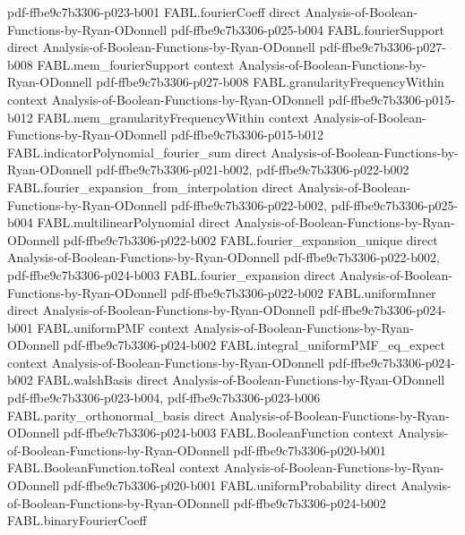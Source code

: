 \begin{theorem}
  {pdf-ffbe9c7b3306-p023-b001}
\proofstep
  {FABL.fourierCoeff}
  {direct}
  {Analysis-of-Boolean-Functions-by-Ryan-ODonnell}
  {pdf-ffbe9c7b3306-p025-b004}
\proofstep
  {FABL.fourierSupport}
  {direct}
  {Analysis-of-Boolean-Functions-by-Ryan-ODonnell}
  {pdf-ffbe9c7b3306-p027-b008}
\proofstep
  {FABL.mem_fourierSupport}
  {context}
  {Analysis-of-Boolean-Functions-by-Ryan-ODonnell}
  {pdf-ffbe9c7b3306-p027-b008}
\proofstep
  {FABL.granularityFrequencyWithin}
  {context}
  {Analysis-of-Boolean-Functions-by-Ryan-ODonnell}
  {pdf-ffbe9c7b3306-p015-b012}
\proofstep
  {FABL.mem_granularityFrequencyWithin}
  {context}
  {Analysis-of-Boolean-Functions-by-Ryan-ODonnell}
  {pdf-ffbe9c7b3306-p015-b012}
\proofstep
  {FABL.indicatorPolynomial_fourier_sum}
  {direct}
  {Analysis-of-Boolean-Functions-by-Ryan-ODonnell}
  {pdf-ffbe9c7b3306-p021-b002,
    pdf-ffbe9c7b3306-p022-b002}
\proofstep
  {FABL.fourier_expansion_from_interpolation}
  {direct}
  {Analysis-of-Boolean-Functions-by-Ryan-ODonnell}
  {pdf-ffbe9c7b3306-p022-b002,
    pdf-ffbe9c7b3306-p025-b004}
\proofstep
  {FABL.multilinearPolynomial}
  {direct}
  {Analysis-of-Boolean-Functions-by-Ryan-ODonnell}
  {pdf-ffbe9c7b3306-p022-b002}
\proofstep
  {FABL.fourier_expansion_unique}
  {direct}
  {Analysis-of-Boolean-Functions-by-Ryan-ODonnell}
  {pdf-ffbe9c7b3306-p022-b002,
    pdf-ffbe9c7b3306-p024-b003}
\proofstep
  {FABL.fourier_expansion}
  {direct}
  {Analysis-of-Boolean-Functions-by-Ryan-ODonnell}
  {pdf-ffbe9c7b3306-p022-b002}
\proofstep
  {FABL.uniformInner}
  {direct}
  {Analysis-of-Boolean-Functions-by-Ryan-ODonnell}
  {pdf-ffbe9c7b3306-p024-b001}
\proofstep
  {FABL.uniformPMF}
  {context}
  {Analysis-of-Boolean-Functions-by-Ryan-ODonnell}
  {pdf-ffbe9c7b3306-p024-b002}
\proofstep
  {FABL.integral_uniformPMF_eq_expect}
  {context}
  {Analysis-of-Boolean-Functions-by-Ryan-ODonnell}
  {pdf-ffbe9c7b3306-p024-b002}
\proofstep
  {FABL.walshBasis}
  {direct}
  {Analysis-of-Boolean-Functions-by-Ryan-ODonnell}
  {pdf-ffbe9c7b3306-p023-b004,
    pdf-ffbe9c7b3306-p023-b006}
\proofstep
  {FABL.parity_orthonormal_basis}
  {direct}
  {Analysis-of-Boolean-Functions-by-Ryan-ODonnell}
  {pdf-ffbe9c7b3306-p024-b003}
\proofstep
  {FABL.BooleanFunction}
  {context}
  {Analysis-of-Boolean-Functions-by-Ryan-ODonnell}
  {pdf-ffbe9c7b3306-p020-b001}
\proofstep
  {FABL.BooleanFunction.toReal}
  {context}
  {Analysis-of-Boolean-Functions-by-Ryan-ODonnell}
  {pdf-ffbe9c7b3306-p020-b001}
\proofstep
  {FABL.uniformProbability}
  {direct}
  {Analysis-of-Boolean-Functions-by-Ryan-ODonnell}
  {pdf-ffbe9c7b3306-p024-b002}
\proofstep
  {FABL.binaryFourierCoeff}

\end{theorem}
